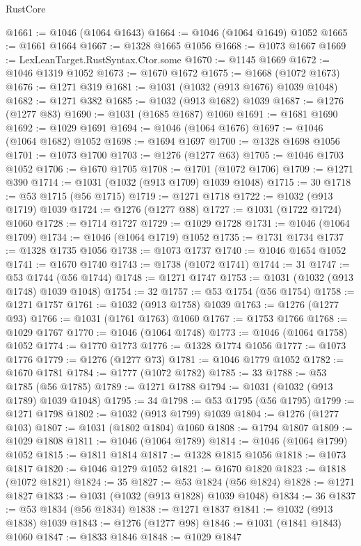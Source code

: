\begin{lexlean}{RustCore}
\begin{coremodule}
@1661 := @1046 (@1064 @1643)
@1664 := @1046 (@1064 @1649) @1052
@1665 := @1661 @1664
@1667 := @1328 @1665 @1056
@1668 := @1073 @1667
@1669 := LexLeanTarget.RustSyntax.Ctor.some
@1670 := @1145 @1669
@1672 := @1046 @1319 @1052
@1673 := @1670 @1672
@1675 := @1668 (@1072 @1673)
@1676 := @1271 @319
@1681 := @1031 (@1032 (@913 @1676) @1039 @1048)
@1682 := @1271 @382
@1685 := @1032 (@913 @1682) @1039
@1687 := @1276 (@1277 @83)
@1690 := @1031 (@1685 @1687) @1060
@1691 := @1681 @1690
@1692 := @1029 @1691
@1694 := @1046 (@1064 @1676)
@1697 := @1046 (@1064 @1682) @1052
@1698 := @1694 @1697
@1700 := @1328 @1698 @1056
@1701 := @1073 @1700
@1703 := @1276 (@1277 @63)
@1705 := @1046 @1703 @1052
@1706 := @1670 @1705
@1708 := @1701 (@1072 @1706)
@1709 := @1271 @390
@1714 := @1031 (@1032 (@913 @1709) @1039 @1048)
@1715 := 30
@1718 := @53 @1715 (@56 @1715)
@1719 := @1271 @1718
@1722 := @1032 (@913 @1719) @1039
@1724 := @1276 (@1277 @88)
@1727 := @1031 (@1722 @1724) @1060
@1728 := @1714 @1727
@1729 := @1029 @1728
@1731 := @1046 (@1064 @1709)
@1734 := @1046 (@1064 @1719) @1052
@1735 := @1731 @1734
@1737 := @1328 @1735 @1056
@1738 := @1073 @1737
@1740 := @1046 @1654 @1052
@1741 := @1670 @1740
@1743 := @1738 (@1072 @1741)
@1744 := 31
@1747 := @53 @1744 (@56 @1744)
@1748 := @1271 @1747
@1753 := @1031 (@1032 (@913 @1748) @1039 @1048)
@1754 := 32
@1757 := @53 @1754 (@56 @1754)
@1758 := @1271 @1757
@1761 := @1032 (@913 @1758) @1039
@1763 := @1276 (@1277 @93)
@1766 := @1031 (@1761 @1763) @1060
@1767 := @1753 @1766
@1768 := @1029 @1767
@1770 := @1046 (@1064 @1748)
@1773 := @1046 (@1064 @1758) @1052
@1774 := @1770 @1773
@1776 := @1328 @1774 @1056
@1777 := @1073 @1776
@1779 := @1276 (@1277 @73)
@1781 := @1046 @1779 @1052
@1782 := @1670 @1781
@1784 := @1777 (@1072 @1782)
@1785 := 33
@1788 := @53 @1785 (@56 @1785)
@1789 := @1271 @1788
@1794 := @1031 (@1032 (@913 @1789) @1039 @1048)
@1795 := 34
@1798 := @53 @1795 (@56 @1795)
@1799 := @1271 @1798
@1802 := @1032 (@913 @1799) @1039
@1804 := @1276 (@1277 @103)
@1807 := @1031 (@1802 @1804) @1060
@1808 := @1794 @1807
@1809 := @1029 @1808
@1811 := @1046 (@1064 @1789)
@1814 := @1046 (@1064 @1799) @1052
@1815 := @1811 @1814
@1817 := @1328 @1815 @1056
@1818 := @1073 @1817
@1820 := @1046 @1279 @1052
@1821 := @1670 @1820
@1823 := @1818 (@1072 @1821)
@1824 := 35
@1827 := @53 @1824 (@56 @1824)
@1828 := @1271 @1827
@1833 := @1031 (@1032 (@913 @1828) @1039 @1048)
@1834 := 36
@1837 := @53 @1834 (@56 @1834)
@1838 := @1271 @1837
@1841 := @1032 (@913 @1838) @1039
@1843 := @1276 (@1277 @98)
@1846 := @1031 (@1841 @1843) @1060
@1847 := @1833 @1846
@1848 := @1029 @1847

\end{coremodule}
\end{lexlean}

